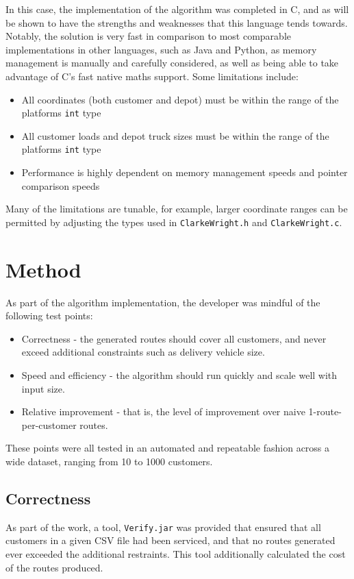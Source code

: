 \documentclass[a4paper]{article}
\begin{document}
    In this case, the implementation of the algorithm was completed in C, and as will be shown to have the strengths and weaknesses that this language tends towards.
    Notably, the solution is very fast in comparison to most comparable implementations in other languages, such as Java and Python, as memory management is
    manually and carefully considered, as well as being able to take advantage of C's fast native maths support.
    Some limitations include:
    \begin{itemize}
        \item All coordinates (both customer and depot) must be within the range of the platforms \texttt{int} type
        \item All customer loads and depot truck sizes must be within the range of the platforms \texttt{int} type
        \item Performance is highly dependent on memory management speeds and pointer comparison speeds
    \end{itemize}
    Many of the limitations are tunable, for example, larger coordinate ranges can be permitted by adjusting the types used in \texttt{ClarkeWright.h} and
    \texttt{ClarkeWright.c}.

    \section{Method}
    As part of the algorithm implementation, the developer was mindful of the following test points:
    \begin{itemize}
        \item Correctness - the generated routes should cover all customers, and never exceed additional constraints such as delivery vehicle size.
        \item Speed and efficiency - the algorithm should run quickly and scale well with input size.
        \item Relative improvement - that is, the level of improvement over naive 1-route-per-customer routes.
    \end{itemize}
    These points were all tested in an automated and repeatable fashion across a wide dataset, ranging from 10 to 1000 customers.

        \subsection{Correctness}
        As part of the work, a tool, \texttt{Verify.jar} was provided that ensured that all customers in a given CSV file had been serviced, and that no
        routes generated ever exceeded the additional restraints. This tool additionally calculated the cost of the routes produced.
\end{document}
